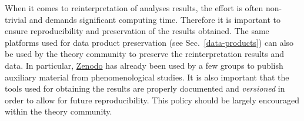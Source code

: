 \documentclass[11pt]{article}
\begin{document}


When it comes to reinterpretation of analyses results, the effort is often non-trivial and demands significant computing time. Therefore it is important to ensure reproducibility and  preservation of the results obtained.
The same platforms used for data product preservation (see Sec.~\ref{data-products}) can also be used by the theory community to preserve the reinterpretation results and data.
In particular, \href{https://zenodo.org/}{Zenodo} has already been used by a few groups to publish auxiliary material from phenomenological studies.
It is also important that the tools used for obtaining the results are properly documented and \emph{versioned} in order to allow for future reproducibility.
This policy should be largely encouraged within the theory community.
\end{document}
